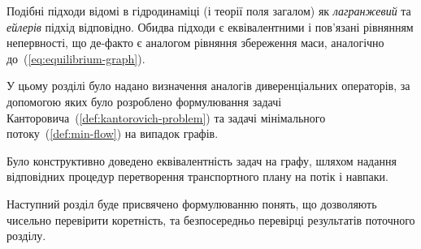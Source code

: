 Подібні підходи відомі в гідродинаміці (і теорії поля загалом) як \textit{лагранжевий} та \textit{ейлерів} підхід відповідно. 
Обидва підходи є еквівалентними і пов'язані рівнянням непервності, що де-факто є аналогом рівняння збереження маси,
аналогічно до~(\ref{eq:equilibrium-graph}).

\chapconclude{\ref{chap:graph}}
У цьому розділі було надано визначення аналогів диверенціальних операторів, за допомогою яких
було розроблено формулювання задачі Канторовича~(\ref{def:kantorovich-problem})
та задачі мінімального потоку~(\ref{def:min-flow}) на випадок графів.

Було конструктивно доведено еквівалентність задач на графу, шляхом надання відповідних процедур перетворення
транспортного плану на потік і навпаки.

Наступний розділ буде присвячено формулюванню понять, що дозволяють чисельно перевірити коретність, та безпосередньо
перевірці результатів поточного розділу.
